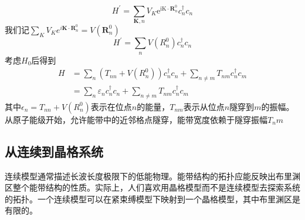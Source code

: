 \documentclass{article}
\numberwithin{equation}{subsection}
\begin{document}
\begin{equation}
    H^{\prime}=\sum_{\mathbf{K}, n} V_{K} \mathrm{e}^{\mathrm{i} \mathrm{K} \cdot \mathbf{R}_{n}^{0}} c_{n}^{\dagger} c_{n}
\end{equation}
我们记$\sum_K V_K e^{i\mathbf{K}\cdot\mathbf{R}_n^0}=V(\mathbf{R}_n^0)$
\begin{equation}
    H^{\prime}=\sum_{n} V\left(R_{n}^{0}\right) c_{n}^{\dagger} c_{n}
\end{equation}
考虑$H_0$后得到
\begin{equation}
    \begin{aligned}
        H &=\sum_{n}\left(T_{n n}+V\left(R_{n}^{0}\right)\right) c_{n}^{\dagger} c_{n}+\sum_{n \neq m} T_{n m} c_{n}^{\dagger} c_{m} \\
        &=\sum_{n} \varepsilon_{n} c_{n}^{\dagger} c_{n}+\sum_{n \neq m} T_{n m} c_{n}^{\dagger} c_{m}
        \end{aligned}
\end{equation}
其中$\epsilon_n=T_{nn}+V(R_n^0)$表示在位点$n$的能量，$T_{nm}$表示从位点$n$隧穿到$m$的振幅。从原子能级开始，允许能带中的近邻格点隧穿，能带宽度依赖于隧穿振幅$T_nm$
\subsection{从连续到晶格系统}
连续模型通常描述长波长度极限下的低能物理。能带结构的拓扑应能反映出布里渊区整个能带结构的性质。实际上，人们喜欢用晶格模型而不是连续模型去探索系统的拓扑。一个连续模型可以在紧束缚模型下映射到一个晶格模型，其中布里渊区是有限的。
\end{document}
